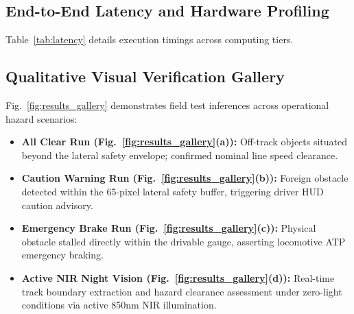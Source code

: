 \documentclass[conference]{IEEEtran}
\begin{document}
\subsection{End-to-End Latency and Hardware Profiling}
Table~\ref{tab:latency} details execution timings across computing tiers.

\begin{table}[h]
\caption{End-to-End Execution Latency and Throughput Across Hardware}
\label{tab:latency}
\centering
{}
\end{table}

\subsection{Qualitative Visual Verification Gallery}
Fig.~\ref{fig:results_gallery} demonstrates field test inferences across operational hazard scenarios:
\begin{itemize}
    \item \textbf{All Clear Run (Fig.~\ref{fig:results_gallery}(a)):} Off-track objects situated beyond the lateral safety envelope; confirmed nominal line speed clearance.
    \item \textbf{Caution Warning Run (Fig.~\ref{fig:results_gallery}(b)):} Foreign obstacle detected within the 65-pixel lateral safety buffer, triggering driver HUD caution advisory.
    \item \textbf{Emergency Brake Run (Fig.~\ref{fig:results_gallery}(c)):} Physical obstacle stalled directly within the drivable gauge, asserting locomotive ATP emergency braking.
    \item \textbf{Active NIR Night Vision (Fig.~\ref{fig:results_gallery}(d)):} Real-time track boundary extraction and hazard clearance assessment under zero-light conditions via active 850nm NIR illumination.
\end{itemize}
\end{document}
